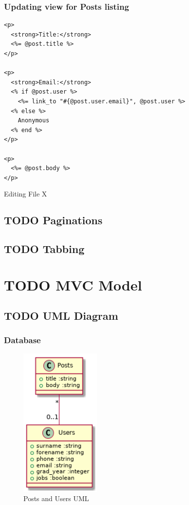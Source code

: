 \documentclass[a4paper]{article}
\begin{document}
\subsubsection{Updating view for Posts listing}
\label{sec-2-6-6}
\begin{listing}[H]
\begin{verbatim}
<p>
  <strong>Title:</strong>
  <%= @post.title %>
</p>

<p>
  <strong>Email:</strong>
  <% if @post.user %>
    <%= link_to "#{@post.user.email}", @post.user %>
  <% else %>
    Anonymous
  <% end %>
</p>

<p>
  <%= @post.body %>
</p>
\end{verbatim}
\caption{Editing File X}
\end{listing}



\subsection{{\bfseries\sffamily TODO} Paginations}
\label{sec-2-7}

\subsection{{\bfseries\sffamily TODO} Tabbing}
\label{sec-2-8}

\section{{\bfseries\sffamily TODO} MVC Model}
\label{sec-3}

\subsection{{\bfseries\sffamily TODO} UML Diagram}
\label{sec-3-1}


\subsubsection{Database}
\label{sec-3-1-1}
\begin{center}
\begin{figure}[htb]
\centering
\includegraphics[width=4cm]{posts-users.png}
\caption{Posts and Users UML}
\end{figure}
\end{center}
\end{document}
